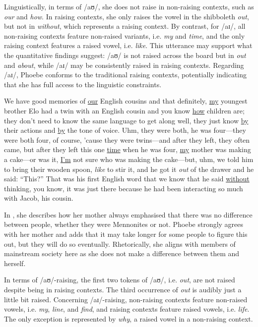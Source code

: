 \documentclass[output=paper]{langscibook}
\begin{document}
Linguistically, in terms of /aʊ/, she does not raise in non-raising contexts, such as \textit{our} and \textit{how}. In raising contexts, she only raises the vowel in the shibboleth \textit{out}, but not in \textit{without}, which represents a raising context. By contrast, for /aɪ/, all non-raising contexts feature non-raised variants, i.e. \textit{my} and \textit{time}, and the only raising context features a raised vowel, i.e. \textit{like}. This utterance may support what the quantitative findings suggest: /aʊ/ is not raised across the board but in \textit{out} and \textit{about}, while /aɪ/ may be consistently raised in raising contexts. Regarding /aɪ/, Phoebe conforms to the traditional raising contexts, potentially indicating that she has full access to the linguistic constraints.

\begin{exe}
    \ex\label{neuhausen:ex:11} We have good memories of \ul{our} English cousins and that definitely, \ul{my} youngest brother Elo had a twin with an English cousin and you know \ul{how} children are; they don’t need to know the same language to get along well, they just know \ul{by} their actions and \ul{by} the tone of voice. Uhm, they were both, he was four—they were both four, of course, ’cause they were twins—and after they left, they often came, but after they left this one \ul{time} when he was four, \ul{my} mother was making a cake—or was it, \ul{I’m} not sure who was making the cake—but, uhm, we told him to bring their wooden spoon, \textit{like} to stir it, and he got it \textit{out} of the drawer and he said: “This?” That was his first English word that we know that he said \ul{without} thinking, you know, it was just there because he had been interacting so much with Jacob, his cousin.
\end{exe}


In , she describes how her mother always emphasised that there was no difference between people, whether they were Mennonites or not. Phoebe strongly agrees with her mother and adds that it may take longer for some people to figure this out, but they will do so eventually. Rhetorically, she aligns with members of mainstream society here as she does not make a difference between them and herself. 

In terms of /aʊ/-raising, the first two tokens of /aʊ/, i.e. \textit{out}, are not raised despite being in raising contexts. The third occurrence of \textit{out} is audibly just a little bit raised. Concerning /aɪ/-raising, non-raising contexts feature non-raised vowels, i.e. \textit{my}, \textit{line}, and \textit{find}, and raising contexts feature raised vowels, i.e. \textit{life}. The only exception is represented by \textit{why}, a raised vowel in a non-raising context.
\end{document}
